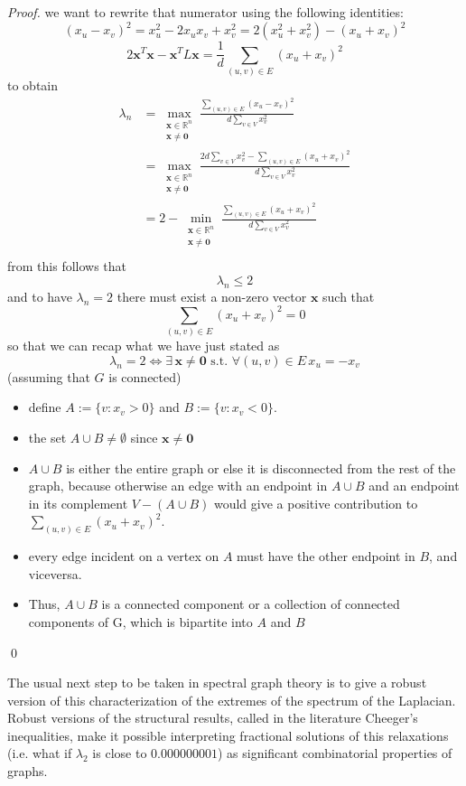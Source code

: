 \begin{theorem}
\begin{proof}
we want to rewrite that numerator using the following identities:
\[ (x_u - x_v)^2 = x_u^2 -2x_{u}x_{v} + x_v^2 = 2(x_u^2 + x_v^2) - (x_u+x_v)^2 \]
\[ 2 \mathbf{x}^T\mathbf{x} -\mathbf{x}^T L \mathbf{x} = \frac{1}{d} \sum_{(u,v)\in E}(x_u+x_v)^2 \]
to obtain
\begin{align}
\lambda_n & = \max_{\substack{\mathbf{x} \in \mathbb{R}^n \\ \mathbf{x} \ne \mathbf{0}}} \frac{\sum_{(u,v)\in E}(x_u-x_v)^2}{d \sum_{v \in V} x_v^2 } \\
          & = \max_{\substack{\mathbf{x} \in \mathbb{R}^n \\ \mathbf{x} \ne \mathbf{0}}} \frac{2d \sum_{v \in V} x_v^2 -\sum_{(u,v)\in E}(x_u+x_v)^2}{d \sum_{v \in V} x_v^2 } \\
          & = 2 - \min_{\substack{\mathbf{x} \in \mathbb{R}^n \\ \mathbf{x} \ne \mathbf{0}}} \frac{\sum_{(u,v)\in E}(x_u+x_v)^2}{d \sum_{v \in V} x_v^2 } \\
\end{align}
from this follows that 
\[ \lambda_n \leq 2 \]
and to have $ \lambda_n = 2 $ there must exist a non-zero vector $ \mathbf{x} $ such that 
\[ \sum_{(u,v)\in E}(x_u+x_v)^2 = 0 \]
so that we can recap what we have just stated as
\[\lambda_n = 2 \iff \exists \, \mathbf{x} \ne \mathbf{0} \text{ s.t. } \forall (u,v) \in E \, x_u = -x_v \]
(assuming that $ G $ is connected) \\
\begin{itemize}
\item define $ A:=\{v : x_v > 0\} $ and $ B:=\{v : x_v < 0\} $. \\
\item the set $ A \cup B  \ne \emptyset $ since $ \mathbf{x} \ne \mathbf{0} $
\item $ A \cup B $ is either the entire graph or else it is disconnected from the rest of the graph, because otherwise an edge with an endpoint in $ A \cup B $ and an endpoint in its complement $ V - (A \cup B)$ would give a positive contribution to $ \sum_{(u,v)\in E}(x_u+x_v)^2 $.\\
\item every edge incident on a vertex on $ A $ must have the other endpoint in $ B $, and viceversa.\\
\item Thus, $ A \cup B$ is a connected component or a collection of connected components of G, which is bipartite into $ A $ and $ B $
\end{itemize}
\qed
\end{proof}
\end{theorem}
The usual next step to be taken in spectral graph theory is to give a robust version of this characterization of the extremes of the spectrum of the Laplacian. Robust versions of the structural results, called in the literature Cheeger's inequalities, make it possible interpreting fractional solutions of this relaxations (i.e. what if $ \lambda_2 $ is close to $ 0.000000001 $) as significant combinatorial properties of graphs.
